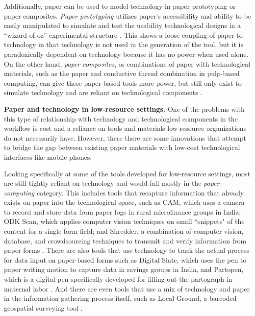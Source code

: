 \documentclass{sig-alternate}
\begin{document}
Additionally, paper can be used to model technology in paper prototyping or paper composites. \emph{Paper prototyping} utilizes paper's accessibility and ability to be easily manipulated to simulate and test the usability technological designs in a ``wizard of oz'' experimental structure \cite{synder2001,chandler2002}. This shows a loose coupling of paper to technology in that technology is not used in the generation of the tool, but it is paradoxically dependent on technology because it has no power when used alone. On the other hand, \emph{paper composites}, or combinations of paper with technological materials, such as the paper and conductive thread combination in pulp-based computing, can give these paper-based tools more power, but still only exist to simulate technology and are reliant on technological components \cite{coelho2009}.

\textbf{Paper and technology in low-resource settings.} One of the problems with this type of relationship with technology and technological components in the workflow is cost and a reliance on tools and materials low-resource organizations do not necessarily have. However, there there are some innovations that attempt to bridge the gap between existing paper materials with low-cost technological interfaces like mobile phones.

Looking specifically at some of the tools developed for low-resource settings, most are still tightly reliant on technology and would fall mostly in the \emph{paper computing} category. This includes tools that recapture information that already exists on paper into the technological space, such as CAM, which uses a camera to record and store data from paper logs in rural microfinance groups in India; ODK Scan, which applies computer vision techniques on small ``snippets" of the content for a single form field; and Shredder, a combination of computer vision, database, and crowdsourcing techniques to transmit and verify information from paper forms \cite{parikh2006, akona2009, dell2012, dell2013, chen2012}. There are also tools that use technology to track the actual process for data input on paper-based forms such as Digital Slate, which uses the pen to paper writing motion to capture data in savings groups in India, and Partopen, which is a digital pen specifically developed for filling out the partograph in maternal labor \cite{ratan2010, underwood2012, underwood2013}. And there are even tools that use a mix of technology and paper in the information gathering process itself, such as Local Ground, a barcoded geospatial surveying tool \cite{wart2010}.
\end{document}
